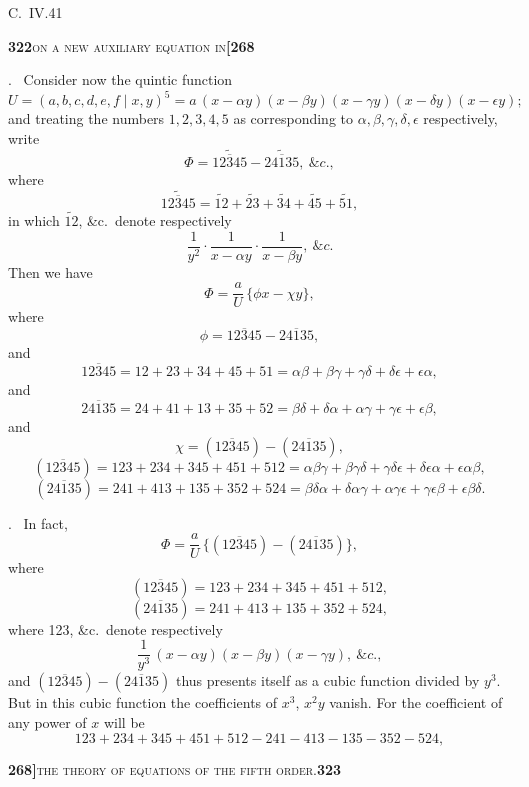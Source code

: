 \documentclass[11pt]{article}
\newcommand{\Cdel}{\mid}
\begin{document}
\hfill C.~IV.\hfill 41

\newpage
\setcounter{page}{322}

\noindent\textbf{322}\hfill\textsc{on a new auxiliary equation in}\hfill\textbf{[268}

\medskip

. \ Consider now the quintic function
\[
   U = (a, b, c, d, e, f\Cdel x, y)^5 = a\,(x - \alpha y)(x - \beta y)(x - \gamma y)(x - \delta y)(x - \epsilon y);
\]
and treating the numbers $1, 2, 3, 4, 5$ as corresponding to $\alpha, \beta, \gamma, \delta, \epsilon$ respectively, write
\[
   \Phi = \widetilde{\overline{12345}} - \widetilde{\overline{24135}},\ \&c.,
\]
where
\[
   \widetilde{\overline{12345}} = \widetilde{12} + \widetilde{23} + \widetilde{34} + \widetilde{45} + \widetilde{51},
\]
in which $\widetilde{12}$, \&c.\ denote respectively
\[
   \frac{1}{y^2}\cdot\frac{1}{x - \alpha y}\cdot\frac{1}{x - \beta y},\ \&c.
\]
Then we have
\[
   \Phi = \frac{a}{U}\,\{\phi x - \chi y\},
\]
where
\[
   \phi = \overline{12345} - \overline{24135},
\]
and
\[
   \overline{12345} = 12 + 23 + 34 + 45 + 51 = \alpha\beta + \beta\gamma + \gamma\delta + \delta\epsilon + \epsilon\alpha,
\]
and
\[
   \overline{24135} = 24 + 41 + 13 + 35 + 52 = \beta\delta + \delta\alpha + \alpha\gamma + \gamma\epsilon + \epsilon\beta,
\]
and
\[
   \chi = (\overline{12345}) - (\overline{24135}),
\]
\[
   (\overline{12345}) = 123 + 234 + 345 + 451 + 512 = \alpha\beta\gamma + \beta\gamma\delta + \gamma\delta\epsilon + \delta\epsilon\alpha + \epsilon\alpha\beta,
\]
\[
   (\overline{24135}) = 241 + 413 + 135 + 352 + 524 = \beta\delta\alpha + \delta\alpha\gamma + \alpha\gamma\epsilon + \gamma\epsilon\beta + \epsilon\beta\delta.
\]

\medskip

. \ In fact,
\[
   \Phi = \frac{a}{U}\,\{(\overline{12345}) - (\overline{24135})\},
\]
where
\[
   (\overline{12345}) = 123 + 234 + 345 + 451 + 512,
\]
\[
   (\overline{24135}) = 241 + 413 + 135 + 352 + 524,
\]
where 123, \&c.\ denote respectively
\[
   \frac{1}{y^3}\,(x - \alpha y)(x - \beta y)(x - \gamma y),\ \&c.,
\]
and $(\overline{12345}) - (\overline{24135})$ thus presents itself as a cubic function divided by $y^3$. But in this cubic function the coefficients of $x^3$, $x^2 y$ vanish. For the coefficient of any power of $x$ will be
\[
   123 + 234 + 345 + 451 + 512 - 241 - 413 - 135 - 352 - 524,
\]

\newpage
\setcounter{page}{323}

\noindent\textbf{268]}\hfill\textsc{the theory of equations of the fifth order.}\hfill\textbf{323}
\end{document}
